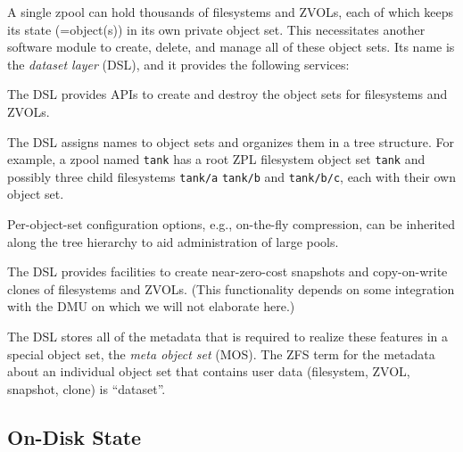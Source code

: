\documentclass[12pt,a4paper,twoside]{book}
\begin{document}
A single zpool can hold thousands of filesystems and ZVOLs, each of which keeps its state (=object(s)) in its own private object set.
This necessitates another software module to create, delete, and manage all of these object sets.
Its name is the \textit{dataset layer} (DSL), and it provides the following services:
\begin{description}[noitemsep,leftmargin=1.5cm,labelindent=1cm]
    \item[Creation \& Destruction Of Object Sets] The DSL provides APIs to create and destroy the object sets for filesystems and ZVOLs.
    \item[Naming \& Hierarchical Organization Of Object Sets] The DSL assigns names to object sets and organizes them in a tree structure.
        For example, a zpool named \lstinline{tank} has a root ZPL filesystem object set \lstinline{tank} and possibly three child filesystems \lstinline{tank/a} \lstinline{tank/b} and \lstinline{tank/b/c}, each with their own object set.
    \item[Properties \& Inheritance] Per-object-set configuration options, e.g., on-the-fly compression, can be inherited along the tree hierarchy to aid administration of large pools.
    \item[Snapshots \& Clones] The DSL provides facilities to create near-zero-cost snapshots and copy-on-write clones of filesystems and ZVOLs.
        (This functionality depends on some integration with the DMU on which we will not elaborate here.)
\end{description}
The DSL stores all of the metadata that is required to realize these features in a special object set, the \textit{meta object set} (MOS).
The ZFS term for the metadata about an individual object set that contains user data (filesystem, ZVOL, snapshot, clone) is ``dataset''.

\subsection{On-Disk State}\label{sec:openzfs_background:ondiskstate}
\end{document}
